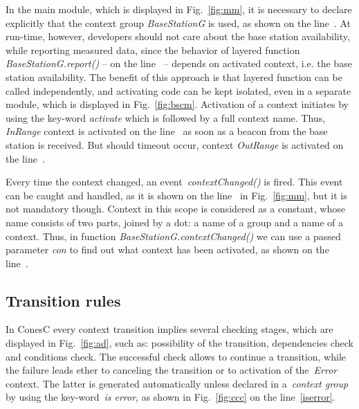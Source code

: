 
In the main module, which is displayed in Fig.~\ref{fig:mm}, it is necessary to declare
explicitly that the context group \emph{BaseStationG} is used, as shown on the line~.
At run-time, however, developers should not care about the base station availability, while
reporting measured data, since the behavior of layered function
\emph{BaseStationG.report()} -- on the line~ -- depends on activated
context, i.e. the base station availability. The benefit of
this approach is that layered function can be called independently, and activating code
can be kept isolated, even in a separate module, which is displayed in Fig.~\ref{fig:bscm}.
Activation of a context initiates by using the key-word
\emph{activate} which is followed by a full context name. Thus,
\emph{InRange} context is activated on the line~ as soon as a
beacon from the base station is received. But should timeout occur, context
\emph{OutRange} is activated on the line~.



Every time the context changed, an event~\emph{contextChanged()} is fired. This event can be
caught and handled, as it is shown on the line~ in Fig.~\ref{fig:mm},
but it is not mandatory though. Context in this scope is considered as a constant,
whose name consists of two parts, joined by a dot: a name of a group and a name
of a context. Thus, in function \emph{BaseStationG.contextChanged()} we can use
a passed parameter \emph{con} to find out what context has been activated, as
shown on the line~.

\subsection{Transition rules}\label{subsec:rules}

In ConesC every context transition implies several checking stages, which are displayed in
Fig.~\ref{fig:ad}, such as: possibility of the transition, dependencies check and conditions
check. The successful check allows to continue a transition, while the failure leads ether to
canceling the transition or to activation of the~\emph{Error} context. The latter is generated
automatically unless declared in a~\emph{context group} by using the key-word~\emph{is error},
as shown in Fig.~\ref{fig:ccc} on the line~\ref{iserror}.

